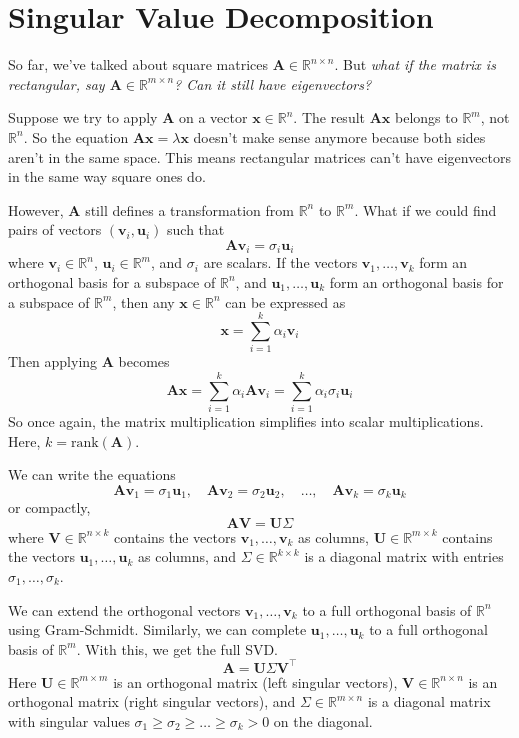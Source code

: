 \section{Singular Value Decomposition}

So far, we've talked about square matrices $\mathbf{A} \in \mathbb{R}^{n \times n}$. But \textit{what if the matrix is rectangular, say $\mathbf{A} \in \mathbb{R}^{m \times n}$? Can it still have eigenvectors?}

Suppose we try to apply $\mathbf{A}$ on a vector $\mathbf{x} \in \mathbb{R}^{n}$. The result $\mathbf{A}\mathbf{x}$ belongs to $\mathbb{R}^m$, not $\mathbb{R}^n$. So the equation $\mathbf{A}\mathbf{x} = \lambda \mathbf{x}$ doesn't make sense anymore because both sides aren't in the same space. This means rectangular matrices can't have eigenvectors in the same way square ones do.

However, $\mathbf{A}$ still defines a transformation from $\mathbb{R}^n$ to $\mathbb{R}^m$. What if we could find pairs of vectors $(\mathbf{v}_i, \mathbf{u}_i)$ such that
\[
\mathbf{A} \mathbf{v}_i = \sigma_i \mathbf{u}_i
\]
where $\mathbf{v}_i \in \mathbb{R}^n$, $\mathbf{u}_i \in \mathbb{R}^m$, and $\sigma_i$ are scalars. If the vectors $\mathbf{v}_1, \dots, \mathbf{v}_k$ form an orthogonal basis for a subspace of $\mathbb{R}^n$, and $\mathbf{u}_1, \dots, \mathbf{u}_k$ form an orthogonal basis for a subspace of $\mathbb{R}^m$, then any $\mathbf{x} \in \mathbb{R}^n$ can be expressed as
\[
\mathbf{x} = \sum_{i=1}^{k} \alpha_i \mathbf{v}_i
\]
Then applying $\mathbf{A}$ becomes
\[
\mathbf{A} \mathbf{x} = \sum_{i=1}^{k} \alpha_i \mathbf{A} \mathbf{v}_i = \sum_{i=1}^{k} \alpha_i \sigma_i \mathbf{u}_i
\]
So once again, the matrix multiplication simplifies into scalar multiplications. Here, $k = \text{rank}(\mathbf{A})$.

We can write the equations
\[
\mathbf{A} \mathbf{v}_1 = \sigma_1 \mathbf{u}_1, \quad \mathbf{A} \mathbf{v}_2 = \sigma_2 \mathbf{u}_2, \quad \dots, \quad \mathbf{A} \mathbf{v}_k = \sigma_k \mathbf{u}_k
\]
or compactly,
\[
\mathbf{A} \mathbf{V} = \mathbf{U} \Sigma
\]
where $\mathbf{V} \in \mathbb{R}^{n \times k}$ contains the vectors $\mathbf{v}_1, \dots, \mathbf{v}_k$ as columns, $\mathbf{U} \in \mathbb{R}^{m \times k}$ contains the vectors $\mathbf{u}_1, \dots, \mathbf{u}_k$ as columns, and $\Sigma \in \mathbb{R}^{k \times k}$ is a diagonal matrix with entries $\sigma_1, \dots, \sigma_k$.

We can extend the orthogonal vectors $\mathbf{v}_1, \dots, \mathbf{v}_k$ to a full orthogonal basis of $\mathbb{R}^n$ using Gram-Schmidt. Similarly, we can complete $\mathbf{u}_1, \dots, \mathbf{u}_k$ to a full orthogonal basis of $\mathbb{R}^m$. With this, we get the full SVD.
\[
\mathbf{A} = \mathbf{U} \Sigma \mathbf{V}^\top
\]
Here $\mathbf{U} \in \mathbb{R}^{m \times m}$ is an orthogonal matrix (left singular vectors), $\mathbf{V} \in \mathbb{R}^{n \times n}$ is an orthogonal matrix (right singular vectors), and $\Sigma \in \mathbb{R}^{m \times n}$ is a diagonal matrix with singular values $\sigma_1 \ge \sigma_2 \ge \dots \ge \sigma_k > 0$ on the diagonal.

